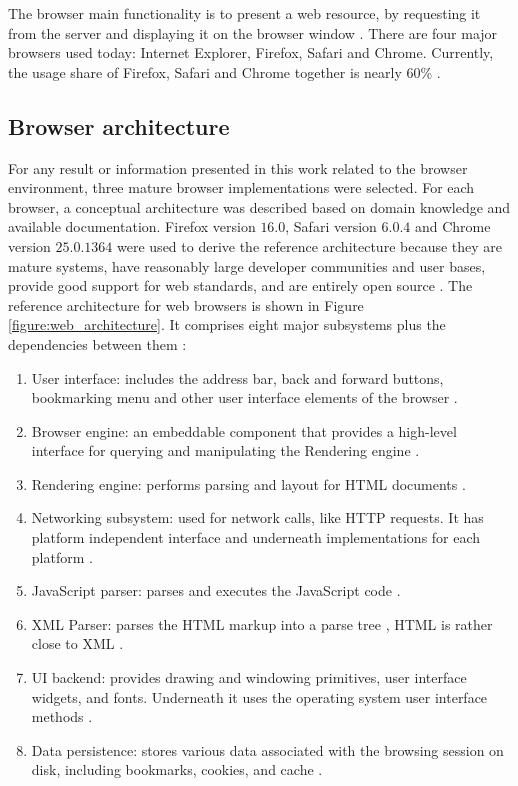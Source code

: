 The browser main functionality is to present a web resource, by requesting it from the server and displaying it on the browser window \cite{Traffic2013}. There are four major browsers used today: Internet Explorer, Firefox, Safari and Chrome. Currently, the usage share of Firefox, Safari and Chrome together is nearly 60\% \cite{Traffic2013}.


\subsection{Browser architecture} %
\label{sub:basic_concepts:web:browser_architecture}

For any result or information presented in this work related to the browser environment, three mature browser implementations were selected. For each browser, a conceptual architecture was described based on domain knowledge and available documentation. Firefox version $16.0$, Safari version $6.0.4$ and Chrome version $25.0.1364$ were used to derive the reference architecture because they are mature systems, have reasonably large developer communities and user bases, provide good support for web standards, and are entirely open source \cite{WC2006,Grosskurth2005}. The reference architecture for web browsers is shown in Figure \ref{figure:web_architecture}. It comprises eight major subsystems plus the dependencies between them \cite{Grosskurth2005}:

\begin{enumerate}
  \item User interface: includes the address bar, back and forward buttons, bookmarking menu and other user interface elements of the browser \cite{Grosskurth2005}.
  \item Browser engine: an embeddable component that provides a high-level interface for querying and manipulating the Rendering engine \cite{Grosskurth2005,Rocks2013}.
  \item Rendering engine: performs parsing and layout for HTML documents \cite{Grosskurth2005,Rocks2013}.
  \item Networking subsystem: used for network calls, like HTTP requests. It has platform independent interface and underneath implementations for each platform \cite{Grosskurth2005,Rocks2013}.
  \item JavaScript parser: parses and executes the JavaScript \cite{International2009} code \cite{Grosskurth2005}.
  \item XML Parser: parses the HTML markup into a parse tree \cite{Hickson2013}, HTML is rather close to XML \cite{Rocks2013,Hickson2013}.
  \item UI backend: provides drawing and windowing primitives, user interface widgets, and fonts. Underneath it uses the operating system user interface methods \cite{Grosskurth2005}.
  \item Data persistence: stores various data associated with the browsing session on disk, including bookmarks, cookies, and cache \cite{Grosskurth2005,Rocks2013}.
\end{enumerate}

